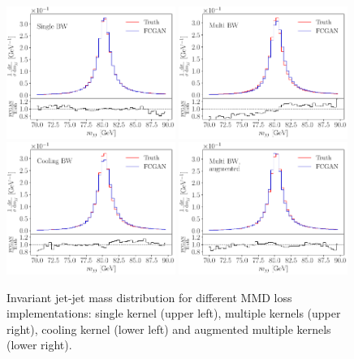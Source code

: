 \begin{appendices}
\begin{figure}[t]
\centering
\includegraphics[page=1,width=0.49\textwidth]{figures/cGAN/single_1}
\includegraphics[page=1,width=0.49\textwidth]{figures/cGAN/multi_1}\\
\includegraphics[page=1,width=0.49\textwidth]{figures/cGAN/cooling_1}
\includegraphics[page=1,width=0.49\textwidth]{figures/cGAN/combined_1}
\caption{Invariant jet-jet mass distribution for different MMD loss
  implementations: single kernel (upper left), multiple kernels (upper
  right), cooling kernel (lower left) and augmented multiple kernels
  (lower right).}
\label{fig:kernels_comparison}
\end{figure}

\end{appendices}